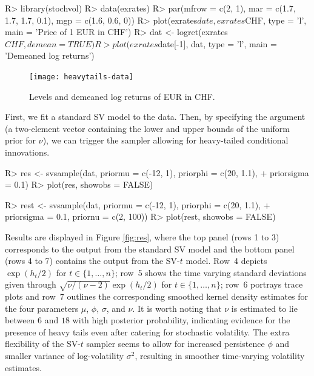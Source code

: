 \documentclass[article, nojss]{jss}
\begin{document}
\begin{Schunk}
\begin{Sinput}
R> library(stochvol)
R> data(exrates)
R> par(mfrow = c(2, 1), mar = c(1.7, 1.7, 1.7, 0.1), mgp = c(1.6, 0.6, 0))
R> plot(exrates$date, exrates$CHF, type = 'l', main = 'Price of 1 EUR in CHF')
R> dat <- logret(exrates$CHF, demean = TRUE)
R> plot(exrates$date[-1], dat, type = 'l', main = 'Demeaned log returns')
\end{Sinput}
\end{Schunk}

\begin{figure}[!ht]
\begin{center}
 \texttt{[image: heavytails-data]}
 \caption{Levels and demeaned log returns of EUR in CHF.}
 \label{fig:data}
\end{center}
\end{figure}

First, we fit a standard SV model to the data. Then, by specifying the argument  (a two-element vector containing the lower and upper bounds of the uniform prior for $\nu$), we can trigger the sampler allowing for heavy-tailed conditional innovations. 

\begin{Schunk}
\begin{Sinput}
R> res <- svsample(dat, priormu = c(-12, 1), priorphi = c(20, 1.1),
+    priorsigma = 0.1)
R> plot(res, showobs = FALSE)
\end{Sinput}
\end{Schunk}

\begin{Schunk}
\begin{Sinput}
R> rest <- svsample(dat, priormu = c(-12, 1), priorphi = c(20, 1.1),
+    priorsigma = 0.1, priornu = c(2, 100))
R> plot(rest, showobs = FALSE)
\end{Sinput}
\end{Schunk}

Results are displayed in Figure \ref{fig:res}, where the top panel (rows 1 to 3) corresponds to the output from the standard SV model and the bottom panel (rows 4 to 7) contains the output from the SV-$t$ model. Row~4 depicts $\exp(h_t/2)$ for $t \in \{1,\dots,n\}$; row~5 shows the time varying standard deviations given through $\sqrt{\nu/(\nu-2)}\exp(h_t/2)$ for $t \in \{1,\dots,n\}$; row~6 portrays trace plots and row~7 outlines the corresponding smoothed kernel density estimates for the four parameters $\mu$, $\phi$, $\sigma$, and $\nu$. It is worth noting that $\nu$ is estimated to lie between $6$ and $18$ with high posterior probability, indicating evidence for the presence of heavy tails even after catering for stochastic volatility. The extra flexibility of the SV-$t$ sampler seems to allow for increased persistence $\phi$ and smaller variance of log-volatility $\sigma^2$, resulting in smoother time-varying volatility estimates.
\end{document}
